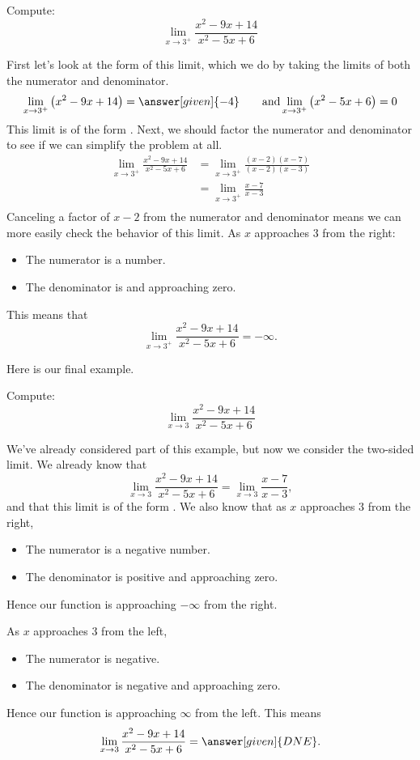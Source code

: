 \documentclass{ximera}
\begin{document}
\begin{example}
  Compute:
  \[
  \lim_{x\to 3^+} \frac{x^2-9x+14}{x^2-5x+6}
  \]
  \begin{explanation}
    First let's look at the form of this limit, which we do by taking the limits of both the numerator and denominator.
    \[
    \lim_{x\to 3^+} \left(x^2-9x+14\right) = \answer[given]{-4}\qquad\text{and}\lim_{x\to3^+}\left(x^2-5x+6\right) = 0
    \]
    This limit is of the form \numOverZero. Next, we should factor the numerator and denominator to see if we can simplify the problem at all. 
    \begin{align*}
      \lim_{x\to 3^+}\frac{x^2-9x+14}{x^2-5x+6} &= \lim_{x\to 3^+}\frac{(x-2)(x-7)}{(x-2)(x-3)}\\
      &= \lim_{x\to 3^+}\frac{x-7}{x-3}\\
    \end{align*}
    Canceling a factor of $x-2$ from the numerator and denominator
    means we can more easily check the behavior of this limit.  As $x$
    approaches $3$ from the right:
    \begin{itemize}
    \item The numerator is a  number. 
    \item The denominator is  and approaching zero.
    \end{itemize}
    This means that
    \[
    \lim_{x\to 3^+} \frac{x^2-9x+14}{x^2-5x+6} = -\infty.
    \]
   \end{explanation}
\end{example}

Here is our final example.

\begin{example}
  Compute:
  \[
  \lim_{x\to 3} \frac{x^2-9x+14}{x^2-5x+6}
  \]
  \begin{explanation}
    We've already considered part of this example, but now we consider the two-sided limit. We already know that
    \[
    \lim_{x\to 3} \frac{x^2-9x+14}{x^2-5x+6} = \lim_{x\to
      3}\frac{x-7}{x-3},
    \]
    and that this limit is of the form \numOverZero.
    We also know that as $x$ approaches $3$ from the right,
    \begin{itemize}
    \item The numerator is a negative number. 
    \item The denominator is positive and approaching zero.
    \end{itemize}
    Hence our function is approaching $-\infty$ from the right.
    
    As $x$ approaches $3$ from the left,
    \begin{itemize}
    \item The numerator is negative.
    \item The denominator is negative and approaching zero.
    \end{itemize}
    Hence our function is approaching $\infty$ from the left.
    This means
    \[
    \lim_{x\to 3} \frac{x^2-9x+14}{x^2-5x+6} = \answer[given]{DNE}.
    \]
  \end{explanation}
\end{example}
\end{document}
